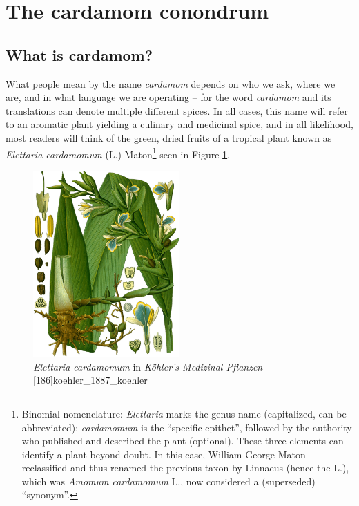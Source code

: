 \documentclass[12pt]{article}
\begin{document}
\section{The cardamom conondrum}\label{sec:plants}

\subsection{What is cardamom?}


What people mean by the name \textit{cardamom} depends on who we ask, where we are, and in what language we are operating -- for the word \textit{cardamom} and its translations can denote multiple different spices. In all cases, this name will refer to an aromatic plant yielding a culinary and medicinal spice, and in all likelihood, most readers will think of the green, dried fruits of a tropical plant known as \textit{Elettaria cardamomum} (L.) Maton\footnote{Binomial nomenclature: \textit{Elettaria} marks the genus name (capitalized, can be abbreviated); \textit{cardamomum} is the ``specific epithet'', followed by the authority who published and described the plant (optional). These three elements can identify a plant beyond doubt. In this case, William George Maton reclassified and thus renamed the previous taxon by Linnaeus (hence the L.), which was \textit{Amomum cardamomum} L., now considered a (superseded) ``synonym''.} seen in Figure \ref{fig:cardamom}.


\begin{figure}
    \centering
    \includegraphics[width=0.5\textwidth]{imgs/cardamom.png}
    \caption{\textit{Elettaria cardamomum} in \textit{Köhler's Medizinal Pflanzen} [186]{koehler_1887_koehler}}
    \label{fig:cardamom}
\end{figure}
\end{document}
